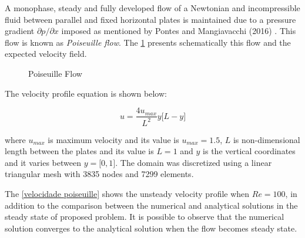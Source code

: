 A monophase, steady and fully developed flow of a Newtonian 
and incompressible fluid between parallel and fixed horizontal 
plates is maintained due to a pressure gradient 
$\partial p/ \partial x$ imposed as mentioned by Pontes 
and Mangiavacchi (2016) \cite{pontes2016}. 
This flow is known as \textit{Poiseuille flow}. 
The \ref{poiseuille} presents schematically this flow and 
the expected velocity field.

\begin{figure}[H]
\begin{center}
\end{center}
\caption{Poiseuille Flow}
\label{poiseuille}
\end{figure}

\noindent
The velocity profile equation is shown below:

\begin{equation}
 u = \frac{4 u_{max}}{L^2} y \big[ L - y \big]
\end{equation}

\medskip
\noindent
where $u_{max}$ is maximum velocity and its value is 
$u_{max} = 1.5$, $L$ is non-dimensional length 
between the plates and its value is 
$L = 1$
and $y$ is the vertical coordinates and it varies 
between $y = \big[ 0,1 \big]$.
The domain was discretized using a linear triangular mesh
with 3835 nodes and 7299 elements.

\bigskip
The \ref{velocidade poiseuille} shows the unsteady velocity profile
when $Re=100$, in addition to the comparison between the 
numerical and analytical solutions in the steady state of
proposed problem. It is possible to observe that the numerical
solution converges to the analytical solution when the flow
becomes steady state.


